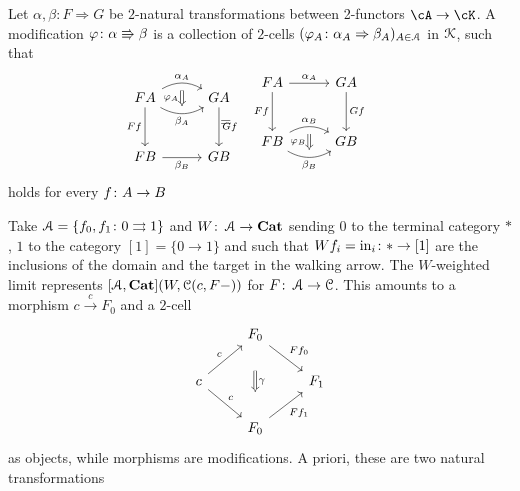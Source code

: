 \documentclass[a4paper,11pt,oneside,openany]{scrbook}
\begin{document}
\begin{defn}
	Let $\alpha,\beta\colon F\Rightarrow G$ be $2$-natural transformations
    between 2-functors $\cA\rightarrow\cK$. A modification
    $\varphi\colon\alpha\Rrightarrow\beta$ is a collection of $2$-cells
    $(\varphi_A\colon\alpha_A\Rightarrow\beta_A)_{A\in\operatorname{\mathcal{A}}}$ in $\operatorname{\mathcal{K}}$, such that
	\[
		\begin{minipage}{0.3\linewidth}
			\begin{tikzcd}[row sep=1cm, column sep=1cm]
				FA\arrow[d, "Ff"'] \arrow[r, bend right, "\beta_A"', ""{name=D, anchor=center}] \arrow[r, bend left,"\alpha_A", ""{name=U, anchor=center}] & GA \arrow[d, "Gf"] \\
				FB\arrow[r, "\beta_B"']            &GB
				\ar[Rightarrow, shorten <= .3em, shorten >= .3em, "\varphi_A"', from=U, to=D]
			\end{tikzcd}
		\end{minipage}
		\hspace{-1.3cm}
		=
		\hspace{.4cm}
		\begin{minipage}{0.3\linewidth}
			\begin{tikzcd}[row sep=1cm, column sep=1cm]
				FA\arrow[d,"Ff"'] \arrow[r, "\alpha_A"]                        &  GA\arrow[d,"Gf"] \\
				FB\arrow[r, bend right, "\beta_B"', ""{name=D, anchor=center}] \arrow[r, bend left,"\alpha_B", ""{name=U, anchor=center}] &    GB
				\ar[Rightarrow, shorten <= .3em, shorten >= .3em, "\varphi_B"', from=U, to=D]
			\end{tikzcd}
		\end{minipage}
	\]
	holds for every $f\colon A\to B$
\end{defn}
Take $\operatorname{\mathcal{A}}=\{f_0,f_1\colon 0\rightrightarrows 1\}$ and $W\colon\operatorname{\mathcal{A}}\to{\normalfont\textbf{Cat}}$ sending
$0$ to the terminal category $*$, $1$ to the category $[1]=\{0\to 1\}$ and such
that $Wf_i=\text{in}_i\colon *\to[1]$ are the inclusions of the domain and the
target in the walking arrow. The $W$-weighted limit represents
$[\operatorname{\mathcal{A}},{\normalfont\textbf{Cat}}](W,\operatorname{\mathcal{C}}(c,F-))$ for $F\colon\operatorname{\mathcal{A}}\to\operatorname{\mathcal{C}}$. This amounts to a morphism
$c\xrightarrow{c}F_0$ and a $2$-cell
\[
	\begin{tikzcd}
		& F_0\ar[dd, "\gamma", Rightarrow, shorten <= 1.8em, shorten >= 1.8em]\ar[dr, "Ff_0"]&\\
		c\ar[dr,"c"]\ar[ur,"c"]&&F_1\\
		&F_0\ar[ur,"Ff_1"']&
	\end{tikzcd}
\]
as objects, while morphisms are modifications. A priori, these are two natural transformations
\end{document}
